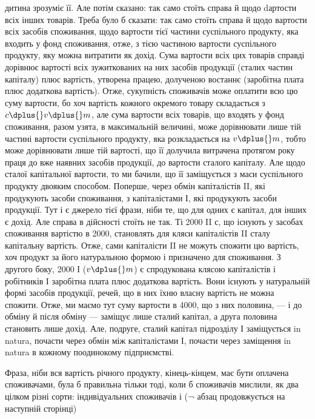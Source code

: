 дитина зрозуміє її. Але потім сказано: так само стоїть справа й щодо
dартости всіх інших товарів. Треба було б сказати: так само стоїть справа
й щодо вартости всіх засобів споживання, щодо вартости тієї
частини суспільного продукту, яка входить у фонд споживання, отже, з
тією частиною вартости суспільного продукту, яку можна витратити як
дохід. Сума вартости всіх цих товарів справді дорівнює вартості всіх
зужиткованих на них засобів продукції (сталих частин капіталу) плюс
вартість, утворена працею, долученою востаннє (заробітна плата плюс
додаткова вартість). Отже, сукупність споживачів може оплатити всю цю
суму вартости, бо хоч вартість кожного окремого товару складається
з $c \dplus{} v \dplus{} m$, але сума вартости всіх товарів, що входять у фонд
споживання, разом узята, в максимальній величині, може дорівнювати лише
тій частині вартости суспільного продукту, яка розкладається на $v \dplus{} m$,
тобто може дорівнювати лише тій вартості, що її долучила витрачена
протягом року праця до вже наявних засобів продукції, до вартости сталого
капіталу. Але щодо сталої капітальної вартости, то ми бачили, що
її заміщується з маси суспільного продукту двояким способом. Поперше,
через обмін капіталістів II, які продукують засоби споживання, з капіталістами
І, які продукують засоби продукції. Тут і є джерело тієї фрази,
ніби те, що для одних є капітал, для інших є дохід. Але справа в дійсності
стоїть не так. Ті 2000 II с, що існують у засобах споживання вартістю
в 2000, становлять для кляси капіталістів II сталу капітальну вартість.
Отже, сами капіталісти II не можуть спожити цю вартість, хоч продукт
за його натуральною формою і призначено для споживання. З другого
боку, 2000 І ($v \dplus{} m$) є спродукована клясою капіталістів і робітників І
заробітна плата плюс додаткова вартість. Вони існують у натуральній
формі засобів продукції, речей, що в них їхню власну вартість не можна
спожити. Отже, ми маємо тут суму вартости в 4000, що з них половина,
— і до обміну й після обміну — заміщує лише сталий капітал,
а друга половина становить лише дохід. Але, подруге, сталий капітал
підрозділу І заміщується in natura, почасти через обмін між капіталістами
І, почасти через заміщення in natura в кожному поодинокому підприємстві.

Фраза, ніби вся вартість річного продукту, кінець-кінцем, має бути
оплачена споживачами, була б правильна тільки тоді, коли б споживачів
мислили, як два цілком різні сорти: індивідуальних споживачів і\parbreak{} (¬ абзац продовжується на наступній сторінці)
